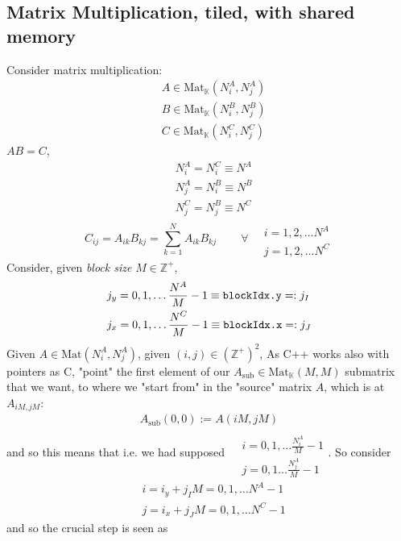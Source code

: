 \documentclass[10pt]{amsart}
\begin{document}
\begin{multicols*}{2}
\section{Matrix Multiplication, tiled, with shared memory}
Consider matrix multiplication:  
\[
\begin{aligned}
& A \in \text{Mat}_{\mathbb{K}}(N_i^A, N_j^A)  \\ 
& B \in \text{Mat}_{\mathbb{K}}(N_i^B, N_j^B)  \\
& C \in \text{Mat}_{\mathbb{K}}(N_i^C, N_j^C)  
\end{aligned}
\]
$AB=C$, 
\[
\begin{aligned}
& N_i^A = N_i^C \equiv N^A \\ 
& N_j^A = N_i^B \equiv N^B \\ 
& N_j^C = N_j^B \equiv N^C 
\end{aligned}
\]
\[
C_{ij} = A_{ik}B_{kj} = \sum_{k=1}^N A_{ik} B_{kj} \qquad \, \forall \, \begin{aligned} & \quad \\ 
& i=1,2,\dots N^A \\
& j = 1,2,\dots N^C \end{aligned}
\]
Consider, given \emph{block size} $M\in \mathbb{Z}^+$, 
\[
\begin{aligned}
& j_y = 0,1,\dots \frac{N^A}{M} - 1 \equiv \verb|blockIdx.y| =: j_I \\
& j_x = 0,1,\dots \frac{N^C}{M} -1 \equiv \verb|blockIdx.x| =: j_J 
\end{aligned}
\]
Given $A \in \text{Mat}(N_i^A, N_j^A)$, given $(i,j) \in (\mathbb{Z}^+)^2$, 
As C++ works also with pointers as C, "point" the first element of our $A_{\text{sub}} \in \text{Mat}_{\mathbb{K}}(M,M)$ submatrix that we want, to where we "start from" in the "source" matrix $A$, which is at $A_{iM,jM}$:
\[
\begin{gathered}
A_{\text{sub}}(0,0):=A(iM,jM) 
\end{gathered}
\]
and so this means that i.e. we had supposed $\begin{aligned} & \quad \\
& i=0,1,\dots \frac{N_i^A}{M} - 1 \\
& j=0,1\dots \frac{N_j^A}{M}-1 \end{aligned}$.  
So consider 
\[
\begin{aligned}
& i = i_y +j_IM = 0,1,\dots N^A -1 \\ 
& j = i_x + j_JM = 0,1,\dots N^C - 1 
\end{aligned}
\]
and so the crucial step is seen as 

\end{multicols*}
\end{document}
